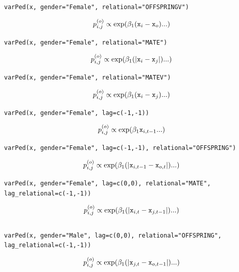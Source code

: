 \documentclass{article}
\begin{document}
\texttt{varPed(x, gender="Female", relational="OFFSPRINGV")}

\begin{equation}
p^{(o)}_{i,j} \propto \textrm{exp}(\beta_{1}(\textrm{\texttt{x}}_{i}-\textrm{\texttt{x}}_{o})...)
\end{equation}

\texttt{varPed(x, gender="Female", relational="MATE")}

\begin{equation}
p^{(o)}_{i,j} \propto \textrm{exp}(\beta_{1}(|\textrm{\texttt{x}}_{i}-\textrm{\texttt{x}}_{j}|)...)
\end{equation}

\texttt{varPed(x, gender="Female", relational="MATEV")}

\begin{equation}
p^{(o)}_{i,j} \propto \textrm{exp}(\beta_{1}(\textrm{\texttt{x}}_{i}-\textrm{\texttt{x}}_{j})...)
\end{equation}

\texttt{varPed(x, gender="Female", lag=c(-1,-1))}

\begin{equation}
p^{(o)}_{i,j} \propto \textrm{exp}(\beta_{1}\textrm{\texttt{x}}_{i,t-1}...)
\end{equation}

\texttt{varPed(x, gender="Female", lag=c(-1,-1), relational="OFFSPRING")}

\begin{equation}
p^{(o)}_{i,j} \propto \textrm{exp}(\beta_{1}(|\textrm{\texttt{x}}_{i,t-1}-\textrm{\texttt{x}}_{o,t}|)...)
\end{equation}

\texttt{varPed(x, gender="Female", lag=c(0,0), relational="MATE",}\\
\texttt{lag\_relational=c(-1,-1))}

\begin{equation}
p^{(o)}_{i,j} \propto \textrm{exp}(\beta_{1}(|\textrm{\texttt{x}}_{i,t}-\textrm{\texttt{x}}_{j,t-1}|)...)
\end{equation}\\

\texttt{varPed(x, gender="Male", lag=c(0,0), relational="OFFSPRING",}\\
\texttt{lag\_relational=c(-1,-1))}

\begin{equation}
p^{(o)}_{i,j} \propto \textrm{exp}(\beta_{1}(|\textrm{\texttt{x}}_{j,t}-\textrm{\texttt{x}}_{o,t-1}|)...)
\end{equation}\\
\end{document}
